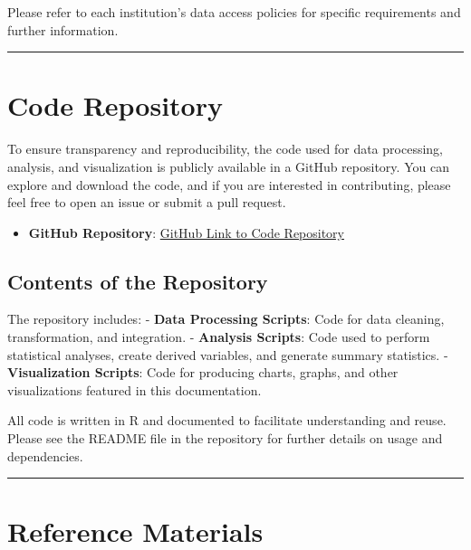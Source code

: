 \documentclass[
]{book}
\providecommand{\tightlist}{%
  \setlength{\itemsep}{0pt}\setlength{\parskip}{0pt}}
\begin{document}
Please refer to each institution's data access policies for specific requirements and further information.

\begin{center}\rule{0.5\linewidth}{0.5pt}\end{center}

\hypertarget{code-repository}{%
\section{Code Repository}\label{code-repository}}

To ensure transparency and reproducibility, the code used for data processing, analysis, and visualization is publicly available in a GitHub repository. You can explore and download the code, and if you are interested in contributing, please feel free to open an issue or submit a pull request.

\begin{itemize}
\tightlist
\item
  \textbf{GitHub Repository}: \href{https://github.com/yourusername/repository-name}{GitHub Link to Code Repository}
\end{itemize}

\hypertarget{contents-of-the-repository}{%
\subsection{Contents of the Repository}\label{contents-of-the-repository}}

The repository includes:
- \textbf{Data Processing Scripts}: Code for data cleaning, transformation, and integration.
- \textbf{Analysis Scripts}: Code used to perform statistical analyses, create derived variables, and generate summary statistics.
- \textbf{Visualization Scripts}: Code for producing charts, graphs, and other visualizations featured in this documentation.

All code is written in R and documented to facilitate understanding and reuse. Please see the README file in the repository for further details on usage and dependencies.

\begin{center}\rule{0.5\linewidth}{0.5pt}\end{center}

\hypertarget{reference-materials}{%
\section{Reference Materials}\label{reference-materials}}
\end{document}
